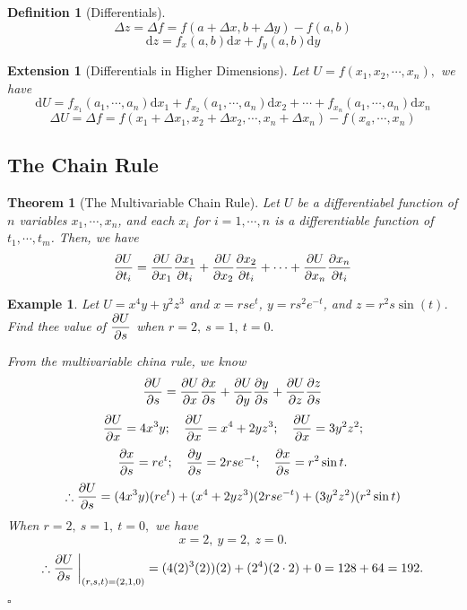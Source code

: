 \documentclass[12pt,a4paper]{article}
\newtheorem{thm}{Theorem}[subsection]
\newtheorem{df}{Definition}[subsection]
\newtheorem{eg}{Example}[subsection]
\newenvironment*{ans}{\par\indent{\textit{Answer. }}\par}{\par\hfill{$\square$}\par}
\newtheorem*{ext}{\indent Extension}
\def\d{{\mathrm{d}}}
\def\dx{\d x}
\begin{document}
\begin{df}[Differentials]
	\[\Delta z=\Delta f=f(a+\Delta x, b+\Delta y)-f(a,b)\]\[\d z=f_x(a,b)\dx+f_y(a,b)\d y\]	
\end{df}
\begin{ext}[Differentials in Higher Dimensions]
	Let $U=f(x_1, x_2,\cdots, x_n),$ we have \[\d U=f_{x_1}(a_1,\cdots,a_n)\dx_1+f_{x_2}(a_1,\cdots,a_n)\dx_2+\cdots+f_{x_n}(a_1,\cdots,a_n)\dx_n\]\[\Delta U=\Delta f=f(x_1+\Delta x_1, x_2+\Delta x_2,\cdots, x_n+\Delta x_n)-f(x_a,\cdots,x_n)\]
\end{ext}

\subsection{The Chain Rule}
\begin{thm}[The Multivariable Chain Rule]
	Let $U$ be a differentiabel function of $n$ variables $x_1,\cdots,x_n$, and each $x_i$ for $i=1,\cdots,n$	is a differentiable function of $t_1,\cdots,t_m$. Then, we have \[\pdv{U}{t_i}=\pdv{U}{x_1}\pdv{x_1}{t_i}+\pdv{U}{x_2}\pdv{x_2}{t_i}+\cdots+\pdv{U}{x_n}\pdv{x_n}{t_i}\]
\end{thm}
\begin{eg}
	Let $U=x^4y+y^2z^3$ and $x=rse^t$, $y=rs^2e^{-t}$, and $z=r^2s\sin(t)$. Find thee value of $\displaystyle\pdv{U}{s}$ when $r=2,\ s=1,\ t=0.$
	\begin{ans}
		From the multivariable china rule, we know \[\pdv{U}{s}=\pdv{U}{x}\pdv{x}{s}+\pdv{U}{y}\pdv{y}{s}+\pdv{U}{z}\pdv{z}{s}\]	\[\pdv{U}{x}=4x^3y;\quad\pdv{U}{x}=x^4+2yz^3;\quad\pdv{U}{x}=3y^2z^2;\]\[\pdv{x}{s}=re^t;\quad\pdv{y}{s}=2rse^{-t};\quad\pdv{x}{s}=r^2\sin{t}.\] \[\therefore\pdv{U}{s}=(4x^3y)(re^t)+(x^4+2yz^3)(2rse^{-t})+(3y^2z^2)(r^2\sin{t})\] When $r=2,\ s=1,\ t=0,$ we have \[x=2,\ y=2,\ z=0.\] \[\therefore\pdv{U}{s}\eval{}_{(r,s,t)=(2,1,0)}=(4(2)^3(2))(2)+(2^4)(2\cdot2)+0=128+64=192.\]
	\end{ans}
\end{eg}
\end{document}
